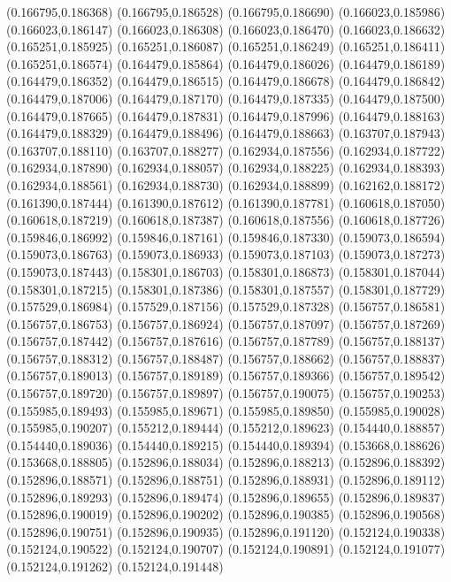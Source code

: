 (0.166795,0.186368)
(0.166795,0.186528)
(0.166795,0.186690)
(0.166023,0.185986)
(0.166023,0.186147)
(0.166023,0.186308)
(0.166023,0.186470)
(0.166023,0.186632)
(0.165251,0.185925)
(0.165251,0.186087)
(0.165251,0.186249)
(0.165251,0.186411)
(0.165251,0.186574)
(0.164479,0.185864)
(0.164479,0.186026)
(0.164479,0.186189)
(0.164479,0.186352)
(0.164479,0.186515)
(0.164479,0.186678)
(0.164479,0.186842)
(0.164479,0.187006)
(0.164479,0.187170)
(0.164479,0.187335)
(0.164479,0.187500)
(0.164479,0.187665)
(0.164479,0.187831)
(0.164479,0.187996)
(0.164479,0.188163)
(0.164479,0.188329)
(0.164479,0.188496)
(0.164479,0.188663)
(0.163707,0.187943)
(0.163707,0.188110)
(0.163707,0.188277)
(0.162934,0.187556)
(0.162934,0.187722)
(0.162934,0.187890)
(0.162934,0.188057)
(0.162934,0.188225)
(0.162934,0.188393)
(0.162934,0.188561)
(0.162934,0.188730)
(0.162934,0.188899)
(0.162162,0.188172)
(0.161390,0.187444)
(0.161390,0.187612)
(0.161390,0.187781)
(0.160618,0.187050)
(0.160618,0.187219)
(0.160618,0.187387)
(0.160618,0.187556)
(0.160618,0.187726)
(0.159846,0.186992)
(0.159846,0.187161)
(0.159846,0.187330)
(0.159073,0.186594)
(0.159073,0.186763)
(0.159073,0.186933)
(0.159073,0.187103)
(0.159073,0.187273)
(0.159073,0.187443)
(0.158301,0.186703)
(0.158301,0.186873)
(0.158301,0.187044)
(0.158301,0.187215)
(0.158301,0.187386)
(0.158301,0.187557)
(0.158301,0.187729)
(0.157529,0.186984)
(0.157529,0.187156)
(0.157529,0.187328)
(0.156757,0.186581)
(0.156757,0.186753)
(0.156757,0.186924)
(0.156757,0.187097)
(0.156757,0.187269)
(0.156757,0.187442)
(0.156757,0.187616)
(0.156757,0.187789)
(0.156757,0.188137)
(0.156757,0.188312)
(0.156757,0.188487)
(0.156757,0.188662)
(0.156757,0.188837)
(0.156757,0.189013)
(0.156757,0.189189)
(0.156757,0.189366)
(0.156757,0.189542)
(0.156757,0.189720)
(0.156757,0.189897)
(0.156757,0.190075)
(0.156757,0.190253)
(0.155985,0.189493)
(0.155985,0.189671)
(0.155985,0.189850)
(0.155985,0.190028)
(0.155985,0.190207)
(0.155212,0.189444)
(0.155212,0.189623)
(0.154440,0.188857)
(0.154440,0.189036)
(0.154440,0.189215)
(0.154440,0.189394)
(0.153668,0.188626)
(0.153668,0.188805)
(0.152896,0.188034)
(0.152896,0.188213)
(0.152896,0.188392)
(0.152896,0.188571)
(0.152896,0.188751)
(0.152896,0.188931)
(0.152896,0.189112)
(0.152896,0.189293)
(0.152896,0.189474)
(0.152896,0.189655)
(0.152896,0.189837)
(0.152896,0.190019)
(0.152896,0.190202)
(0.152896,0.190385)
(0.152896,0.190568)
(0.152896,0.190751)
(0.152896,0.190935)
(0.152896,0.191120)
(0.152124,0.190338)
(0.152124,0.190522)
(0.152124,0.190707)
(0.152124,0.190891)
(0.152124,0.191077)
(0.152124,0.191262)
(0.152124,0.191448)
